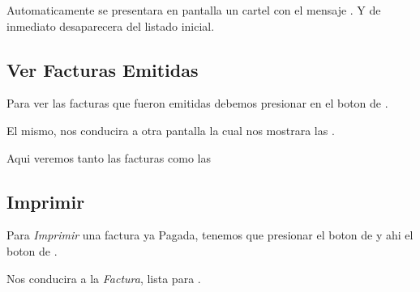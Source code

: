 \documentclass[a4paper,10pt,spanish]{sphinxmanual}
\begin{document}
Automaticamente se presentara en pantalla un cartel con el mensaje . Y de inmediato desaparecera del listado inicial.



\subsection{Ver Facturas Emitidas}
\label{ventas:ver-facturas-emit}\label{ventas:ver-facturas-emitidas}
Para ver las facturas que fueron emitidas debemos presionar en el boton de .


El mismo, nos conducira a otra pantalla la cual nos mostrara las .


Aqui veremos tanto las facturas  como las 



\subsection{Imprimir}
\label{ventas:id2}\label{ventas:imprimir}
Para \emph{Imprimir} una factura ya Pagada, tenemos que presionar el boton de  y ahi el boton de .


Nos conducira a la \emph{Factura}, lista para .

\end{document}

